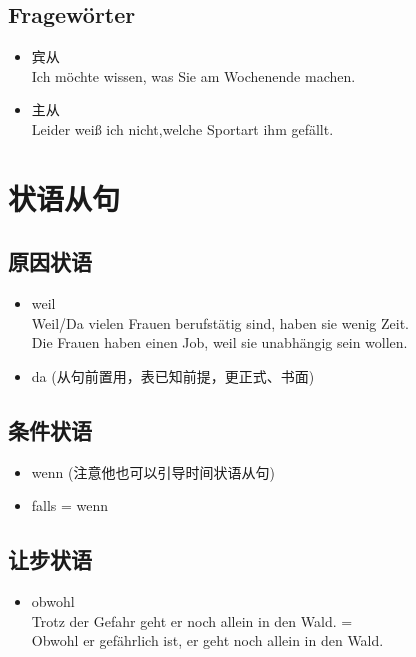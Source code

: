 \subsection{Fragewörter}
\begin{itemize}
    \item 宾从 \\
          Ich möchte wissen, was Sie am Wochenende machen.
    \item 主从 \\
          Leider weiß ich nicht,welche Sportart ihm gefällt.
\end{itemize}

\section{状语从句}
\subsection{原因状语}
\begin{itemize}
    \item weil \\
          Weil/Da vielen Frauen berufstätig sind, haben sie wenig Zeit.  \\
          Die Frauen haben einen Job, weil sie unabhängig sein wollen. \\
    \item da (从句前置用，表已知前提，更正式、书面)
\end{itemize}

\subsection{条件状语}
\begin{itemize}
    \item wenn (注意他也可以引导时间状语从句)
    \item falls = wenn
\end{itemize}

\subsection{让步状语}

\begin{itemize}
    \item obwohl \\
          Trotz der Gefahr geht er noch allein in den Wald. = \\
          Obwohl er gefährlich ist, er geht noch allein in den Wald.
\end{itemize}

